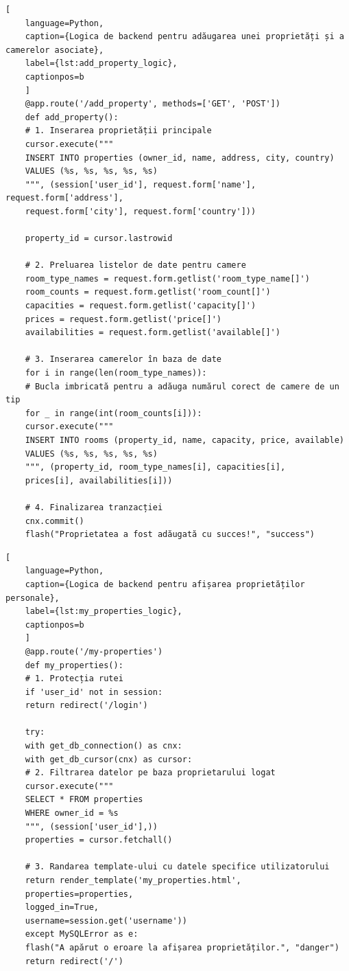 \documentclass[12pt, a4paper, oneside, romanian]{teza-upb}
\begin{document}
\begin{lstlisting}[
	language=Python,
	caption={Logica de backend pentru adăugarea unei proprietăți și a camerelor asociate},
	label={lst:add_property_logic},
	captionpos=b
	]
	@app.route('/add_property', methods=['GET', 'POST'])
	def add_property():
	# 1. Inserarea proprietății principale
	cursor.execute("""
	INSERT INTO properties (owner_id, name, address, city, country) 
	VALUES (%s, %s, %s, %s, %s)
	""", (session['user_id'], request.form['name'], request.form['address'], 
	request.form['city'], request.form['country']))
	
	property_id = cursor.lastrowid
	
	# 2. Preluarea listelor de date pentru camere
	room_type_names = request.form.getlist('room_type_name[]')
	room_counts = request.form.getlist('room_count[]')
	capacities = request.form.getlist('capacity[]')
	prices = request.form.getlist('price[]')
	availabilities = request.form.getlist('available[]')
	
	# 3. Inserarea camerelor în baza de date
	for i in range(len(room_type_names)):
	# Bucla imbricată pentru a adăuga numărul corect de camere de un tip
	for _ in range(int(room_counts[i])):
	cursor.execute("""
	INSERT INTO rooms (property_id, name, capacity, price, available) 
	VALUES (%s, %s, %s, %s, %s)
	""", (property_id, room_type_names[i], capacities[i], 
	prices[i], availabilities[i]))
	
	# 4. Finalizarea tranzacției
	cnx.commit()
	flash("Proprietatea a fost adăugată cu succes!", "success")
\end{lstlisting}

\begin{lstlisting}[
	language=Python,
	caption={Logica de backend pentru afișarea proprietăților personale},
	label={lst:my_properties_logic},
	captionpos=b
	]
	@app.route('/my-properties')
	def my_properties():
	# 1. Protecția rutei
	if 'user_id' not in session:
	return redirect('/login')
	
	try:
	with get_db_connection() as cnx:
	with get_db_cursor(cnx) as cursor:
	# 2. Filtrarea datelor pe baza proprietarului logat
	cursor.execute("""
	SELECT * FROM properties 
	WHERE owner_id = %s
	""", (session['user_id'],))
	properties = cursor.fetchall()
	
	# 3. Randarea template-ului cu datele specifice utilizatorului
	return render_template('my_properties.html', 
	properties=properties, 
	logged_in=True, 
	username=session.get('username'))
	except MySQLError as e:
	flash("A apărut o eroare la afișarea proprietăților.", "danger")
	return redirect('/')
\end{lstlisting}
\end{document}
